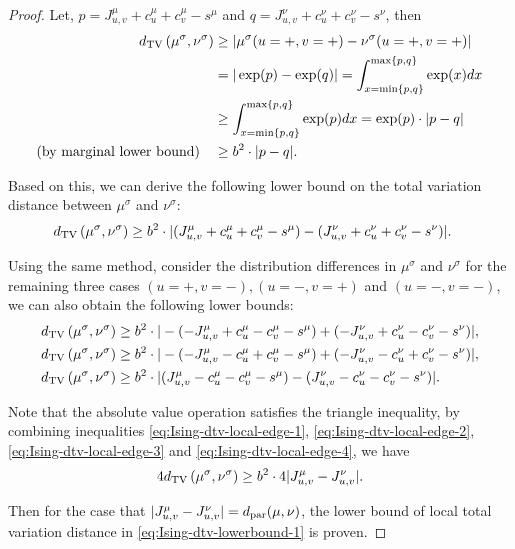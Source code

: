 \begin{proof}
Let, $p=J^\mu_{u,v}+c^\mu_u+c^\mu_v-s^\mu$ and $q=J^\nu_{u,v}+c^\nu_u+c^\nu_v-s^\nu$, then 
\begin{align}\label{eq:Ising-dtv-exp-ineq}
    d_{\mathrm{TV}}\left({\mu^\sigma},{\nu^\sigma}\right) &\geq |\mu^\sigma(u=+,v=+)-\nu^\sigma(u=+,v=+)|
    \nonumber \notag\\&= |\exp(p)-\exp(q)| =\int_{x=\min\{p,q\}}^{\max\{p,q\}} \exp(x)dx
    \nonumber \notag\\&\geq  \int_{x=\min\{p,q\}}^{\max\{p,q\}} \exp(p)dx =\exp(p)\cdot |p-q|
    \nonumber \notag\\{\text{(by marginal lower bound)}}\quad&\geq b^2\cdot |p-q|.
\end{align}

Based on this, we can derive the following lower bound on the total variation distance between $\mu^\sigma$ and $\nu^\sigma$:
\begin{align}
\label{eq:Ising-dtv-local-edge-1}
d_{\mathrm{TV}}\left({\mu^\sigma},{\nu^\sigma}\right) &\geq b^2 \cdot |(J^\mu_{u,v}+c^\mu_u+c^\mu_v-s^\mu)-(J^\nu_{u,v}+c^\nu_u+c^\nu_v-s^\nu)|.
\end{align}

Using the same method, consider the distribution differences in $\mu^\sigma$ and $\nu^\sigma$ for the remaining three cases $(u=+,v=-),(u=-,v=+)$ and $(u=-,v=-)$, we can also obtain the following lower bounds:
\begin{align}
\label{eq:Ising-dtv-local-edge-2}
d_{\mathrm{TV}}\left({\mu^\sigma},{\nu^\sigma}\right) &\geq b^2 \cdot |-(-J^\mu_{u,v}+c^\mu_u-c^\mu_v-s^\mu)+(-J^\nu_{u,v}+c^\nu_u-c^\nu_v-s^\nu)|,
\\
\label{eq:Ising-dtv-local-edge-3}
d_{\mathrm{TV}}\left({\mu^\sigma},{\nu^\sigma}\right) &\geq b^2 \cdot |-(-J^\mu_{u,v}-c^\mu_u+c^\mu_v-s^\mu)+(-J^\nu_{u,v}-c^\nu_u+c^\nu_v-s^\nu)|,
\\
\label{eq:Ising-dtv-local-edge-4}
d_{\mathrm{TV}}\left({\mu^\sigma},{\nu^\sigma}\right) &\geq b^2 \cdot |(J^\mu_{u,v}-c^\mu_u-c^\mu_v-s^\mu)-(J^\nu_{u,v}-c^\nu_u-c^\nu_v-s^\nu)|.
\end{align}

Note that the absolute value operation satisfies the triangle inequality, by combining inequalities \eqref{eq:Ising-dtv-local-edge-1}, \eqref{eq:Ising-dtv-local-edge-2}, \eqref{eq:Ising-dtv-local-edge-3} and \eqref{eq:Ising-dtv-local-edge-4}, we have
\begin{align*}
4d_{\mathrm{TV}}\left({\mu^\sigma},{\nu^\sigma}\right) \geq b^2\cdot 4|J^{\mu}_{u,v}-J^{\nu}_{u,v}|.
\end{align*}

Then for the case that $|J^\mu_{u,v}-J^\nu_{u,v}|=d_\mathrm{par}(\mu,\nu)$, the lower bound of local total variation distance in \eqref{eq:Ising-dtv-lowerbound-1} is proven.
\end{proof}

